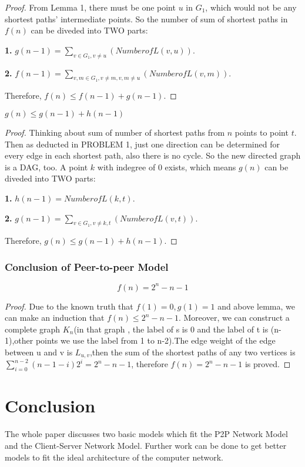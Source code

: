 \documentclass{elegantpaper}
\begin{document}
\begin{proof} \quad From Lemma 1, there must be one point $u$ in $G_{1}$, which would not be any shortest paths' intermediate points. So the number of sum of shortest paths in $f(n)$ can be diveded into TWO parts:

\textbf{1.} \quad $g(n-1) = \sum_{v\in G_{1}, v\neq u}(Number of L(v,u))$.

\textbf{2.} \quad $f(n-1) = \sum_{v,m\in G_{1}, v\neq m, v,m\neq u}(Number of L(v,m))$.

Therefore, $f(n)\leq f(n-1)+g(n-1)$.

\end{proof}
\begin{lemma} \quad $g(n) \leq g(n-1) + h(n-1)$

\begin{proof} \quad Thinking about sum of number of shortest paths from $n$ points to point $t$. Then as deducted in PROBLEM 1, just one direction can be determined for every edge in each shortest path, also there is no cycle. So the new directed graph is a DAG, too. A point $k$ with indegree of $0$ exists, which means $g(n)$ can be diveded into TWO parts: 

\textbf{1.}	\quad $h(n-1) = Number of L(k,t)$.

\textbf{2.} \quad $g(n-1) = \sum_{v\in G_{1}, v\neq k,t}(Number of L(v, t))$.

Therefore, $g(n)\leq g(n-1)+h(n-1)$. \end{proof}
\end{lemma}
\subsubsection{Conclusion of Peer-to-peer Model}
\begin{theorem}
 $$f(n) = 2^{n}-n-1$$
\end{theorem}
\begin{proof}
 Due to the known truth that $f(1) = 0, g(1) = 1$ and above lemma, we can make an induction that $f(n) \leq 2^{n}-n-1$.
 Moreover, we can construct a complete graph $K_n$(in that graph , the label of s is 0 and the label of t is (n-1),other points we use the label from 1 to n-2).The edge weight of the edge between u and v is $L_{u,v}$,then the sum of the shortest paths of any two vertices is $\sum_{i=0}^{n-2}(n-1-i)2^{i} = 2^{n}-n-1$, therefore $f(n) = 2^{n}-n-1$ is proved.
\end{proof}
 

 
\section{Conclusion}
The whole paper discusses two basic models which fit the P2P Network Model and the Client-Server Network Model. Further work can be done to get better models to fit the ideal architecture of the computer network.
 
 
 
\end{document}
